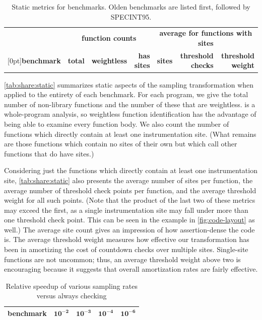 \begin{table}[tb]
  \centering
  \small
  \begin{tabular}{|l|rrr|rrr|}
    \hline
    & \multicolumn{3}{c|}{\textbf{function counts}} & \multicolumn{3}{c|}{\textbf{average for functions with sites}} \\
    \raisebox{1.5ex}[0pt]{\textbf{benchmark}} & \textbf{total} & \textbf{weightless} & \textbf{has sites} & \textbf{sites} & \textbf{threshold checks} & \textbf{threshold weight} \\
    \hline\hline
    
    \hline
    
    \hline
  \end{tabular}
  \caption{Static metrics for \CCured benchmarks.  Olden benchmarks
    are listed first, followed by SPECINT95.}
  \label{tab:share:static}
\end{table}

\autoref{tab:share:static} summarizes static aspects of the sampling
transformation when applied to the entirety of each benchmark.  For
each program, we give the total number of non-library functions and
the number of these that are weightless.  \CCured is a whole-program
analysis, so weightless function identification has the advantage of
being able to examine every function body.  We also count the number
of functions which directly contain at least one instrumentation site.
(What remains are those functions which contain no sites of their own
but which call other functions that do have sites.)

Considering just the functions which directly contain at least one
instrumentation site, \autoref{tab:share:static} also presents the
average number of sites per function, the average number of threshold
check points per function, and the average threshold weight for all
such points.  (Note that the product of the last two of these metrics
may exceed the first, as a single instrumentation site may fall under
more than one threshold check point.  This can be seen in the example
in \autoref{fig:code-layout} as well.)  The average site count gives
an impression of how assertion-dense the code is.  The average
threshold weight measures how effective our transformation has been in
amortizing the cost of countdown checks over multiple sites.
Single-site functions are not uncommon; thus, an average threshold
weight above two is encouraging because it suggests that overall
amortization rates are fairly effective.

\begin{table}
  \centering
  \begin{tabular}{|l|rrrr|}
    \hline
    \rule{0pt}{2.5ex}
    \textbf{benchmark} & $\mathbf{10^{-2}}$ & $\mathbf{10^{-3}}$ & $\mathbf{10^{-4}}$ & $\mathbf{10^{-6}}$ \\
    \hline\hline
    
    \hline
    
    \hline
  \end{tabular}
  \caption{Relative speedup of various sampling rates versus always checking}
  \label{tab:share:density}
\end{table}

